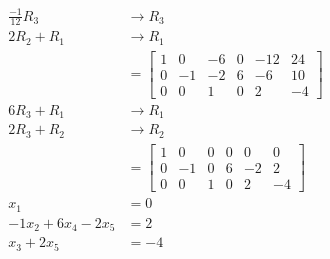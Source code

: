 \documentclass[letterpaper, 12pt]{math}
\begin{document}
\begin{multicols}{2}
\begin{align*}
    \frac{-1}{12}R_3 &\to R_3 \\
    2R_2+R_1 &\to R_1 \\
    &= \begin{bmatrix}
      1 & 0 & -6 & 0 & -12 & 24 \\
      0 & -1 & -2 & 6 & -6 & 10 \\
      0 & 0 & 1 & 0 & 2 & -4
    \end{bmatrix} \\
    6R_3+R_1 &\to R_1 \\
    2R_3+R_2 &\to R_2 \\
    &= \begin{bmatrix}
      1 & 0 & 0 & 0 & 0 & 0 \\
      0 & -1 & 0 & 6 & -2 & 2 \\
      0 & 0 & 1 & 0 & 2 & -4
    \end{bmatrix} \\
    x_1 &= 0 \\
    -1x_2+6x_4-2x_5 &= 2 \\
    x_3+2x_5 &= -4
  \end{align*}
\end{multicols}
\endgroup
\end{document}

